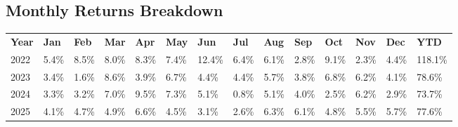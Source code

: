 \documentclass[11pt]{article}
\begin{document}
\subsection*{Monthly Returns Breakdown}
\begin{tcolorbox}[colback=white, colframe=primary, title=\textbf{\large Historical net monthly returns of the selected Hedge Fund basket}, fonttitle=\sffamily\bfseries\large, arc=6pt, boxrule=1pt, toptitle=6pt, bottomtitle=6pt, left=4pt, right=4pt, top=0pt, bottom=0pt, colbacktitle=primary, halign title=center]
\renewcommand{\arraystretch}{1.3}
\begin{tabularx}{\textwidth}{l *{13}{>{\centering\arraybackslash}X}}
\textbf{Year} & \textbf{Jan} & \textbf{Feb} & \textbf{Mar} & \textbf{Apr} & \textbf{May} & \textbf{Jun} & \textbf{Jul} & \textbf{Aug} & \textbf{Sep} & \textbf{Oct} & \textbf{Nov} & \textbf{Dec} & \textbf{YTD} \\
2022 & \cellcolor{posgreen!53!white}5.4\% & \cellcolor{posgreen!85!white}8.5\% & \cellcolor{posgreen!80!white}8.0\% & \cellcolor{posgreen!82!white}8.3\% & \cellcolor{posgreen!74!white}7.4\% & \cellcolor{posgreen!100!white}12.4\% & \cellcolor{posgreen!63!white}6.4\% & \cellcolor{posgreen!60!white}6.1\% & \cellcolor{posgreen!27!white}2.8\% & \cellcolor{posgreen!91!white}9.1\% & \cellcolor{posgreen!23!white}2.3\% & \cellcolor{posgreen!43!white}4.4\% & \cellcolor{posgreen!100!white}118.1\% \\
2023 & \cellcolor{posgreen!34!white}3.4\% & \cellcolor{posgreen!15!white}1.6\% & \cellcolor{posgreen!85!white}8.6\% & \cellcolor{posgreen!38!white}3.9\% & \cellcolor{posgreen!67!white}6.7\% & \cellcolor{posgreen!44!white}4.4\% & \cellcolor{posgreen!44!white}4.4\% & \cellcolor{posgreen!57!white}5.7\% & \cellcolor{posgreen!38!white}3.8\% & \cellcolor{posgreen!68!white}6.8\% & \cellcolor{posgreen!62!white}6.2\% & \cellcolor{posgreen!40!white}4.1\% & \cellcolor{posgreen!100!white}78.6\% \\
2024 & \cellcolor{posgreen!33!white}3.3\% & \cellcolor{posgreen!31!white}3.2\% & \cellcolor{posgreen!69!white}7.0\% & \cellcolor{posgreen!94!white}9.5\% & \cellcolor{posgreen!72!white}7.3\% & \cellcolor{posgreen!51!white}5.1\% & \cellcolor{posgreen!8!white}0.8\% & \cellcolor{posgreen!50!white}5.1\% & \cellcolor{posgreen!39!white}4.0\% & \cellcolor{posgreen!25!white}2.5\% & \cellcolor{posgreen!61!white}6.2\% & \cellcolor{posgreen!28!white}2.9\% & \cellcolor{posgreen!100!white}73.7\% \\
2025 & \cellcolor{posgreen!41!white}4.1\% & \cellcolor{posgreen!46!white}4.7\% & \cellcolor{posgreen!48!white}4.9\% & \cellcolor{posgreen!66!white}6.6\% & \cellcolor{posgreen!45!white}4.5\% & \cellcolor{posgreen!30!white}3.1\% & \cellcolor{posgreen!26!white}2.6\% & \cellcolor{posgreen!63!white}6.3\% & \cellcolor{posgreen!61!white}6.1\% & \cellcolor{posgreen!48!white}4.8\% & \cellcolor{posgreen!54!white}5.5\% & \cellcolor{posgreen!56!white}5.7\% & \cellcolor{posgreen!100!white}77.6\% \\

\end{tabularx}
\end{tcolorbox}
\end{document}
